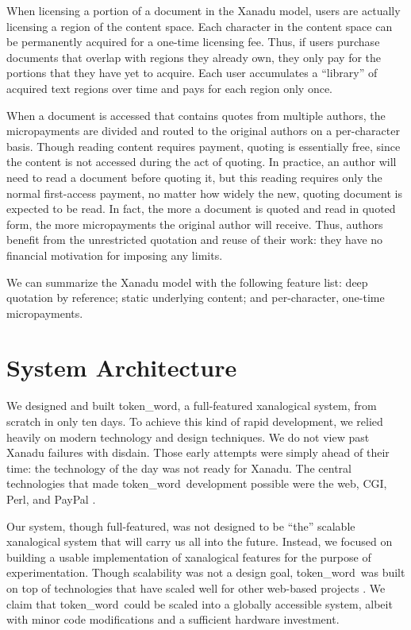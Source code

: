 \documentclass{acm_proc_article-sp}
\newcommand{\tw}{token\_word}
\begin{document}
When licensing a portion of a document in the Xanadu model, users are actually licensing a region of the content space.
Each character in the content space can be permanently acquired for a one-time licensing fee.
Thus, if users purchase documents that overlap with regions they already own, they only pay for the portions that they have yet to acquire.
Each user accumulates a ``library'' of acquired text regions over time and pays for each region only once.

When a document is accessed that contains quotes from multiple authors, the micropayments are divided and routed to the original authors on a per-character basis. 
Though reading content requires payment, quoting is essentially free, since the content is not accessed during the act of quoting.
In practice, an author will need to read a document before quoting it, but this reading requires only the normal first-access payment, no matter how widely the new, quoting document is expected to be read.
In fact, the more a document is quoted and read in quoted form, the more micropayments the original author will receive.
Thus, authors benefit from the unrestricted quotation and reuse of their work:  they have no financial motivation for imposing any limits.

We can summarize the Xanadu model with the following feature list:  deep quotation by reference; static underlying content; and per-character, one-time micropayments.


\section{System Architecture}
We designed and built \tw, a full-featured xanalogical system, from scratch in only ten days.
To achieve this kind of rapid development, we relied heavily on modern technology and design techniques.
We do not view past Xanadu failures with disdain.
Those early attempts were simply ahead of their time:  the technology of the day was not ready for Xanadu.
The central technologies that made \tw \   development possible were the web, CGI, Perl, and PayPal \cite{paypal}.

Our system, though full-featured, was not designed to be ``the'' scalable xanalogical system that will carry us all into the future.
Instead, we focused on building a usable implementation of xanalogical features for the purpose of experimentation.
Though scalability was not a design goal, \tw \  was built on top of technologies that have scaled well for other web-based projects \cite{Everything2, WikiWikiWeb, Wikipedia}.
We claim that \tw \   could be scaled into a globally accessible system, albeit with minor code modifications and a sufficient hardware investment. 
\end{document}
